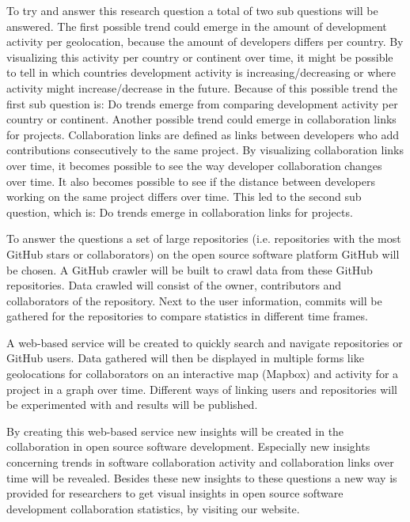 \documentclass[acmtog, authorversion]{acmart}
\begin{document}
To try and answer this research question a total of two sub questions will be answered. The first possible trend could emerge in the amount of development activity per geolocation, because the amount of developers differs per country. 
By visualizing this activity per country or continent over time, it might be possible to tell in which countries development activity is increasing/decreasing or where activity might increase/decrease in the future. 
Because of this possible trend the first sub question is: Do trends emerge from comparing development activity per country or continent. 
Another possible trend could emerge in collaboration links for projects. 
Collaboration links are defined as links between developers who add contributions consecutively to the same project. 
By visualizing collaboration links over time, it becomes possible to see the way developer collaboration changes over time. 
It also becomes possible to see if the distance between developers working on the same project differs over time. 
This led to the second sub question, which is: Do trends emerge in collaboration links for projects.  

To answer the questions a set of large repositories (i.e. repositories with the most GitHub stars or collaborators) on the open source software platform GitHub will be chosen.
A GitHub crawler will be built to crawl data from these GitHub repositories. 
Data crawled will consist of the owner, contributors and collaborators of the repository. Next to the user information, commits will be gathered for the repositories to compare statistics in different time frames.
 
A web-based service will be created to quickly search and navigate repositories or GitHub users.
Data gathered will then be displayed in multiple forms like geolocations for collaborators on an interactive map (Mapbox) and activity for a project in a graph over time. 
Different ways of linking users and repositories will be experimented with and results will be published.

By creating this web-based service new insights will be created in the collaboration in open source software development. 
Especially new insights concerning trends in software collaboration activity and collaboration links over time will be revealed. 
Besides these new insights to these questions a new way is provided for researchers to get visual insights in open source software development collaboration statistics, by visiting our website.



\end{document}
